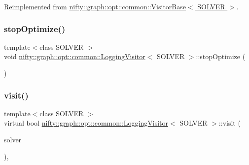 Reimplemented from \hyperlink{classnifty_1_1graph_1_1opt_1_1common_1_1VisitorBase_a41efc013731cca97176a61be58db0094}{nifty\+::graph\+::opt\+::common\+::\+Visitor\+Base$<$ S\+O\+L\+V\+E\+R $>$}.

\mbox{\label{classnifty_1_1graph_1_1opt_1_1common_1_1LoggingVisitor_a744a5519377c2f34057c1e79867f2bc5}} 
\subsubsection{\texorpdfstring{stop\+Optimize()}{stopOptimize()}}
{\footnotesize\ttfamily template$<$class S\+O\+L\+V\+ER $>$ \\
void \hyperlink{classnifty_1_1graph_1_1opt_1_1common_1_1LoggingVisitor}{nifty\+::graph\+::opt\+::common\+::\+Logging\+Visitor}$<$ S\+O\+L\+V\+ER $>$\+::stop\+Optimize (\begin{DoxyParamCaption}{ }\end{DoxyParamCaption})\hspace{0.3cm}{\ttfamily [inline]}}

\mbox{\label{classnifty_1_1graph_1_1opt_1_1common_1_1LoggingVisitor_a0079f597f09fae363906092f00df126b}} 
\subsubsection{\texorpdfstring{visit()}{visit()}}
{\footnotesize\ttfamily template$<$class S\+O\+L\+V\+ER $>$ \\
virtual bool \hyperlink{classnifty_1_1graph_1_1opt_1_1common_1_1LoggingVisitor}{nifty\+::graph\+::opt\+::common\+::\+Logging\+Visitor}$<$ S\+O\+L\+V\+ER $>$\+::visit (\begin{DoxyParamCaption}\item[{\hyperlink{classnifty_1_1graph_1_1opt_1_1common_1_1LoggingVisitor_af6aa5fbf9acd4c1fa02fa34c73b90c1b}{Solver\+Type} $\ast$}]{solver }\end{DoxyParamCaption})\hspace{0.3cm}{\ttfamily [inline]}, {\ttfamily [virtual]}}



